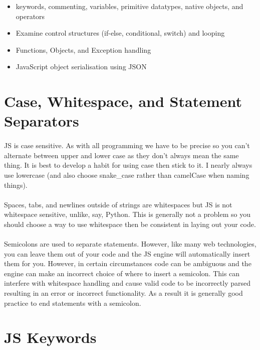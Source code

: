 \begin{itemize}
\item keywords, commenting, variables, primitive datatypes, native objects, and operators
\item Examine control structures (if-else, conditional, switch) and looping
\item Functions, Objects, and Exception handling
\item JavaScript object serialisation using JSON
\end{itemize}

\section{Case, Whitespace, and Statement Separators}
\paragraph{} JS is case sensitive. As with all programming we have to be precise so you can't alternate between upper and lower case as they don't always mean the same thing. It is best to develop a habit for using case then stick to it. I nearly always use lowercase (and also choose snake\_case rather than camelCase when naming things).
\paragraph{} Spaces, tabs, and newlines outside of strings are whitespaces but JS is not whitespace sensitive, unlike, say, Python. This is generally not a problem so you should choose a way to use whitespace then be consistent in laying out your code.
\paragraph{} Semicolons are used to separate statements. However, like many web technologies, you can leave them out of your code and the JS engine will automatically insert them for you. However, in certain circumstances code can be ambiguous and the engine can make an incorrect choice of where to insert a semicolon. This can interfere with whitespace handling and cause valid code to be incorrectly parsed resulting in an error or incorrect functionality. As a result it is generally good practice to end statements with a semicolon.


\section{JS Keywords}

